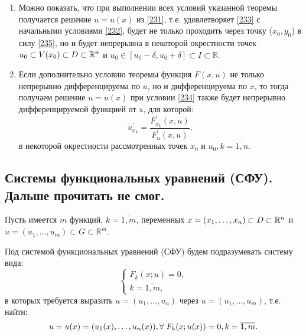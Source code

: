 \begin{note}
    \begin{enumerate}
        \item Можно показать, что при выполнении всех условий указанной теоремы получается решение $u = u(x)$ из \eqref{231}, т.е. удовлетворяет \eqref{233} с начальными условиями \eqref{232}, будет не только проходить через точку ($x_0, y_0$) в силу \eqref{235}, но и будет непрерывна в некоторой окрестности точек $u_0 \subset V(x_0) \subset D \subset \mathbb{R}^n$ и $u_0 \in [u_0 - \delta, u_0 + \delta] \subset I \subset \mathbb{R}$.
        \item Если дополнительно условию теоремы функция $F(x,u)$ не только непрерывно дифференцируема по $u$, но и дифференцируема по $x$, то тогда получаем решение $u = u(x)$ при условии \eqref{234} также будет непрерывно дифференцируемой функцией от x, для которой:
        \begin{equation}
        \label{236}
        u^{'}_{x_k} = \dfrac{F^{'}_{x_k} (x,u)}{F^{'}_{u} (x,u)},
        \end{equation}
        в некоторой окрестности рассмотренных точек $x_0$ и $u_0, k = \overline{1,n}$.
    \end{enumerate}
\end{note}

\subsection{Системы функциональных уравнений (СФУ). Дальше прочитать не смог.}

Пусть имеется $ m $ функций, $ k = \overline{1, m} $, переменных 
$ x = (x_1, \ldots, x_n) \subset D \subset \mathbb{R}^n$ и\\
${ u = (u_1, \ldots, u_m) \subset G \subset \mathbb{R}^m }$.

Под системой функциональных уравнений (СФУ) будем подразумевать систему вида:
\begin{equation}
    \begin{cases}
        F_k (x;u) = 0 , \\
        k = \overline{1, m} ,
    \end{cases}
\end{equation}
в которых требуется выразить $ u = (u_1, \ldots, u_n) $ через ${ u = (u_1, \ldots, u_m) }$, т.е. найти:
\begin{equation*}
    u = u(x) = (u_1(x), \ldots, u_n(x)), \\
    \forall \; F_k (x; u(x)) = 0, \\
    k = \overline{1, m}.
\end{equation*} 
   

